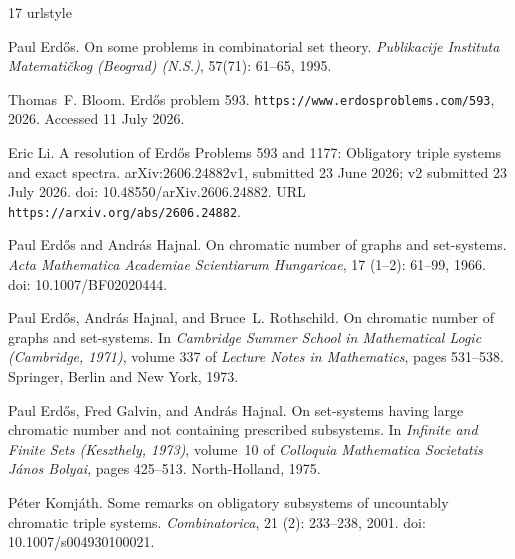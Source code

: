 \documentclass[a4paper,11pt,reqno]{amsart}
\theoremstyle{plain}
\theoremstyle{definition}
\theoremstyle{remark}
\begin{document}
\begin{thebibliography}{17}
\providecommand{\natexlab}[1]{#1}
\providecommand{\url}[1]{\texttt{#1}}
\expandafter\ifx\csname urlstyle\endcsname\relax
  \providecommand{\doi}[1]{doi: #1}\else
  \providecommand{\doi}{doi: \begingroup \urlstyle{rm}\Url}\fi

Paul Erd{\H{o}}s.
\newblock On some problems in combinatorial set theory.
\newblock \emph{Publikacije Instituta Matemati\v{c}kog (Beograd) (N.S.)},
  57(71): 61--65, 1995.

Thomas~F. Bloom.
\newblock Erd{\H{o}}s problem 593.
\newblock \url{https://www.erdosproblems.com/593}, 2026.
\newblock Accessed 11 July 2026.

Eric Li.
\newblock A resolution of {Erd{\H{o}}s Problems 593 and 1177}: Obligatory
  triple systems and exact spectra.
\newblock arXiv:2606.24882v1, submitted 23 June 2026; v2 submitted
  23 July 2026.
\newblock \doi{10.48550/arXiv.2606.24882}.
\newblock URL \url{https://arxiv.org/abs/2606.24882}.

Paul Erd{\H{o}}s and Andr{\'a}s Hajnal.
\newblock On chromatic number of graphs and set-systems.
\newblock \emph{Acta Mathematica Academiae Scientiarum Hungaricae}, 17
  (1--2): 61--99, 1966.
\newblock \doi{10.1007/BF02020444}.

Paul Erd{\H{o}}s, Andr{\'a}s Hajnal, and Bruce~L. Rothschild.
\newblock On chromatic number of graphs and set-systems.
\newblock In \emph{Cambridge Summer School in Mathematical Logic (Cambridge,
  1971)}, volume 337 of \emph{Lecture Notes in Mathematics}, pages 531--538.
  Springer, Berlin and New York, 1973.

Paul Erd{\H{o}}s, Fred Galvin, and Andr{\'a}s Hajnal.
\newblock On set-systems having large chromatic number and not containing
  prescribed subsystems.
\newblock In \emph{Infinite and Finite Sets (Keszthely, 1973)}, volume~10 of
  \emph{Colloquia Mathematica Societatis J{\'a}nos Bolyai}, pages 425--513.
  North-Holland, 1975.

P{\'e}ter Komj{\'a}th.
\newblock Some remarks on obligatory subsystems of uncountably chromatic triple
  systems.
\newblock \emph{Combinatorica}, 21 (2): 233--238, 2001.
\newblock \doi{10.1007/s004930100021}.


\end{thebibliography}
\end{document}

